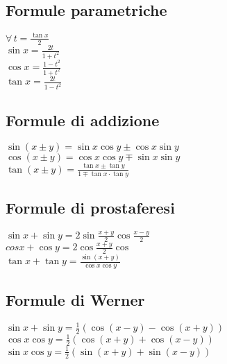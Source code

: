\documentclass[a4paper,12pt]{article}
\theoremstyle{mystyle}
\begin{document}
\subsection{Formule parametriche}
\(\forall \, t = \frac{\tan x}{2}\)\\
\(\sin x = \frac{2t}{1 + t^2} \)\\
\(\cos x = \frac{1 - t^2}{1 + t^2} \)\\
\(\tan x = \frac{2t}{1 - t^2} \)


\subsection{Formule di addizione}
\(\sin(x \pm y) = \sin x \cos y \pm \cos x \sin y \)\\
\(\cos(x \pm y) = \cos x \cos y \mp \sin x \sin y \)\\
\(\tan (x \pm y) = \frac{\tan x \pm \tan y}{1 \mp \tan x \cdot \tan y} \)

\subsection{Formule di prostaferesi}
\(\sin x + \sin y = 2 \sin \frac{x+y}{2} \cos \frac{x-y}{2} \)\\
\(cos x + \cos y = 2 \cos \frac{x+y}{2} \cos \)\\
\(\tan x + \tan y = \frac{\sin(x+y)}{\cos x \cos y} \)

\subsection{Formule di Werner}
\(\sin x + \sin y = \frac{1}{2} (\cos(x-y) - \cos(x+y)) \)\\
\(\cos x \cos y = \frac{1}{2} (\cos (x+y) + \cos (x-y)) \)\\
\(\sin x \cos y = \frac{1}{2} (\sin(x+y) + \sin(x-y)) \)
\end{document}
